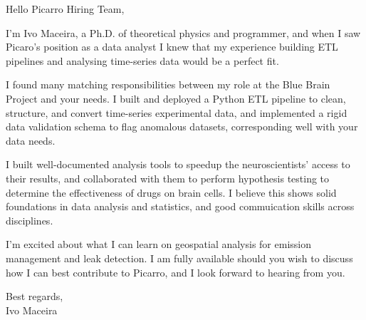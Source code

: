 \documentclass[a4paper,12pt]{letter}
\begin{document}
Hello Picarro Hiring Team,

I'm Ivo Maceira, a Ph.D. of theoretical physics and programmer, and when I saw Picaro's position as a data analyst I knew that my experience building ETL pipelines and analysing time-series data would be a perfect fit.

I found many matching responsibilities between my role at the Blue Brain Project and your needs. I built and deployed a Python ETL pipeline to clean, structure, and convert time-series experimental data, and implemented a rigid data validation schema to flag anomalous datasets, corresponding well with your data needs.

I built well-documented analysis tools to speedup the neuroscientists' access to their results, and collaborated with them to perform hypothesis testing to determine the effectiveness of drugs on brain cells. I believe this shows solid foundations in data analysis and statistics, and good commuication skills across disciplines.

I'm excited about what I can learn on geospatial analysis for emission management and leak detection. I am fully available should you wish to discuss how I can best contribute to Picarro, and I look forward to hearing from you.

Best regards, \\
Ivo Maceira
\end{document}
